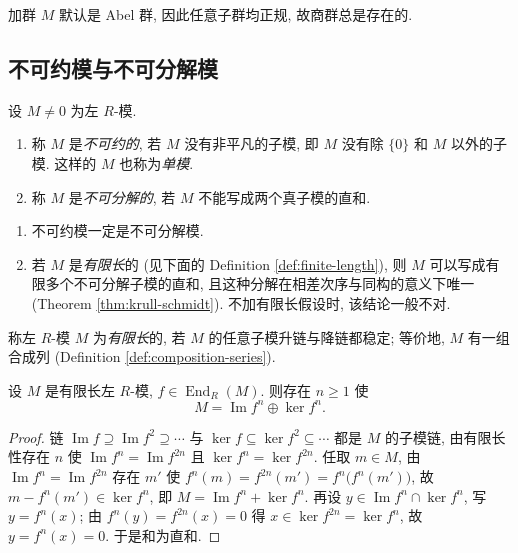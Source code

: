 \begin{remark}\label{rem:quotient-group-exists}
加群 $M$ 默认是 Abel 群, 因此任意子群均正规, 故商群总是存在的.
\end{remark}

\subsection{不可约模与不可分解模}

\begin{definition}\label{def:irreducible-module}
设 $M\ne0$ 为左 $R$-模.
\begin{enumerate}
  \item 称 $M$ 是\emph{不可约的}, 若 $M$ 没有非平凡的子模, 即 $M$ 没有除 $\{0\}$ 和 $M$
  以外的子模. 这样的 $M$ 也称为\emph{单模}.
  \item 称 $M$ 是\emph{不可分解的}, 若 $M$ 不能写成两个真子模的直和.
\end{enumerate}
\end{definition}

\begin{remark}\label{rem:irreducible-vs-indecomposable}
\mbox{}\par\vspace{-0.2em}
\begin{enumerate}
  \item 不可约模一定是不可分解模.
  \item 若 $M$ 是\emph{有限长}的 (见下面的 Definition \ref{def:finite-length}),
  则 $M$ 可以写成有限多个不可分解子模的直和, 且这种分解在相差次序与同构的意义下唯一
  (Theorem \ref{thm:krull-schmidt}). 不加有限长假设时, 该结论一般不对.
\end{enumerate}
\end{remark}

\begin{definition}[有限长模]\label{def:finite-length}
称左 $R$-模 $M$ 为\emph{有限长}的, 若 $M$ 的任意子模升链与降链都稳定;
等价地, $M$ 有一组合成列 (Definition \ref{def:composition-series}).
\end{definition}

\begin{lemma}[Fitting]\label{lem:fitting}
设 $M$ 是有限长左 $R$-模, $f\in\operatorname{End}_R(M)$. 则存在 $n\ge1$ 使
\[
  M=\operatorname{Im}f^n\oplus\ker f^n .
\]
\end{lemma}

\begin{proof}
链 $\operatorname{Im}f\supseteq\operatorname{Im}f^2\supseteq\cdots$ 与
$\ker f\subseteq\ker f^2\subseteq\cdots$ 都是 $M$ 的子模链, 由有限长性存在 $n$ 使
$\operatorname{Im}f^n=\operatorname{Im}f^{2n}$ 且 $\ker f^n=\ker f^{2n}$.
任取 $m\in M$, 由 $\operatorname{Im}f^n=\operatorname{Im}f^{2n}$ 存在 $m'$ 使
$f^n(m)=f^{2n}(m')=f^n\bigl(f^n(m')\bigr)$, 故 $m-f^n(m')\in\ker f^n$, 即
$M=\operatorname{Im}f^n+\ker f^n$.
再设 $y\in\operatorname{Im}f^n\cap\ker f^n$, 写 $y=f^n(x)$; 由 $f^n(y)=f^{2n}(x)=0$ 得
$x\in\ker f^{2n}=\ker f^n$, 故 $y=f^n(x)=0$. 于是和为直和.
\end{proof}

